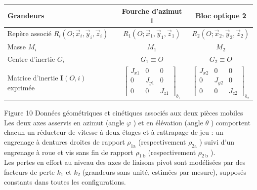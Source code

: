 \documentclass[10pt]{article}
\begin{document}
\begin{center}
\begin{tabular}{|l|c|c|}
\hline
Grandeurs & Fourche d'azimut 1 & Bloc optique 2 \\
\hline
Repère associé $R_{i}\left(O ; \vec{x}_{i}, \vec{y}_{i}, \vec{z}_{i}\right)$ & $R_{1}\left(O ; \vec{x}_{1}, \vec{y}_{1}, \vec{z}_{1}\right)$ & $R_{2}\left(O ; \vec{x}_{2}, \vec{y}_{2}, \vec{z}_{2}\right)$ \\
\hline
Masse $M_{i}$ & $M_{1}$ & $M_{2}$ \\
\hline
Centre d'inertie $G_{i}$ & $G_{1} \equiv O$ & $G_{2} \equiv O$ \\
\hline
Matrice d'inertie $\mathbf{I}(O, i)$ exprimée & $\left[\begin{array}{ccc}J_{x 1} & 0 & 0 \\ 0 & J_{y 1} & 0 \\ 0 & 0 & J_{z 1}\end{array}\right]_{b_{1}}$ & $\left[\begin{array}{ccc}J_{x 2} & 0 & 0 \\ 0 & J_{y 2} & 0 \\ 0 & 0 & J_{z 2}\end{array}\right]_{b_{2}}$ \\
\hline
\end{tabular}
\end{center}

Figure 10 Données géométriques et cinétiques associés aux deux pièces mobiles\\
Les deux axes asservis en azimut (angle $\varphi$ ) et en élévation (angle $\theta$ ) comportent chacun un réducteur de vitesse à deux étages et à rattrapage de jeu : un engrenage à dentures droites de rapport $\rho_{1 \mathrm{a}}$ (respectivement $\rho_{2 \mathrm{a}}$ ) suivi d'un engrenage à roue et vis sans fin de rapport $\rho_{1 \mathrm{~b}}$ (respectivement $\rho_{2 \mathrm{~b}}$ ).\\
Les pertes en effort au niveau des axes de liaisons pivot sont modélisées par des facteurs de perte $k_{1}$ et $k_{2}$ (grandeurs sans unité, estimées par mesure), supposés constants dans toutes les configurations.
\end{document}
